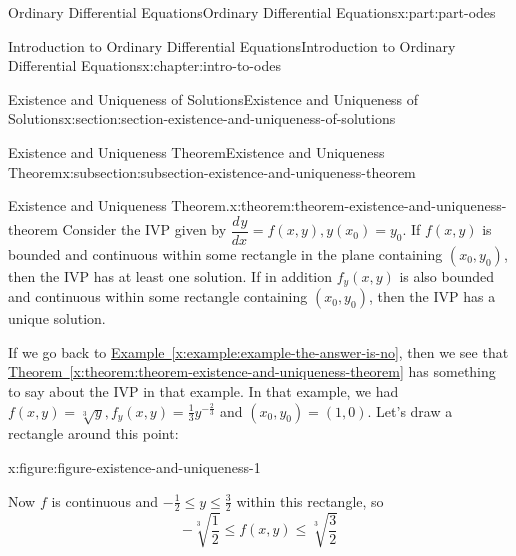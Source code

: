 \documentclass[oneside,10pt,]{book}
\newcommand{\xreffont}{\relax}
\numberwithin{equation}{part}
\newcommand{\dv}[3][]{\dfrac{d^{#1} #2}{d #3^{#1}}}
\begin{document}
\begin{partptx}{Ordinary Differential Equations}{}{Ordinary Differential Equations}{}{}{x:part:part-odes}
\begin{chapterptx}{Introduction to Ordinary Differential Equations}{}{Introduction to Ordinary Differential Equations}{}{}{x:chapter:intro-to-odes}
\begin{sectionptx}{Existence and Uniqueness of Solutions}{}{Existence and Uniqueness of Solutions}{}{}{x:section:section-existence-and-uniqueness-of-solutions}
\begin{subsectionptx}{Existence and Uniqueness Theorem}{}{Existence and Uniqueness Theorem}{}{}{x:subsection:subsection-existence-and-uniqueness-theorem}
\begin{theorem}{Existence and Uniqueness Theorem.}{}{x:theorem:theorem-existence-and-uniqueness-theorem}
%
Consider the IVP given by \(\dv{y}{x} = f(x,y), y(x_{0}) = y_{0}\). If \(f(x,y)\) is bounded and continuous within some rectangle in the plane containing \((x_{0},y_{0})\), then the IVP has at least one solution. If in addition \(f_{y}(x,y)\) is also bounded and continuous within some rectangle containing \((x_{0},y_{0})\), then the IVP has a unique solution.%
\end{theorem}
If we go back to \hyperref[x:example:example-the-answer-is-no]{Example~{\xreffont\ref{x:example:example-the-answer-is-no}}}, then we see that \hyperref[x:theorem:theorem-existence-and-uniqueness-theorem]{Theorem~{\xreffont\ref{x:theorem:theorem-existence-and-uniqueness-theorem}}} has something to say about the IVP in that example. In that example, we had \(f(x,y) = \sqrt[3]{y}, f_{y}(x,y) = \frac{1}{3}y^{-\frac{2}{3}}\) and \((x_{0},y_{0}) = (1,0)\). Let's draw a rectangle around this point: \begin{figureptx}{}{x:figure:figure-existence-and-uniqueness-1}{}%
\begin{image}{0.25}{0.5}{0.25}%
%
\end{image}%
\tcblower
\end{figureptx}%
%
\par
Now \(f\) is continuous and \(-\frac{1}{2}\leq y\leq\frac{3}{2}\) within this rectangle, so%
\begin{equation*}
-\sqrt[3]{\frac{1}{2}}\leq f(x,y)\leq\sqrt[3]{\frac{3}{2}}
\end{equation*}

\end{subsectionptx}
\end{sectionptx}
\end{chapterptx}
\end{partptx}
\end{document}
